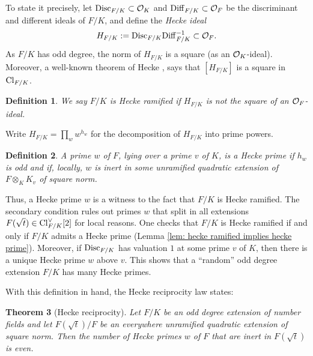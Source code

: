 \documentclass[11pt,a4paper]{amsart}
\def\O{{\rm \mathcal{O}}}
\def\Cl{{\rm Cl}}
\def\Diff{{\rm Diff}}
\def\Disc{{\rm Disc}}
\numberwithin{equation}{section}
\newtheorem{theorem}{Theorem}[section]
\newtheorem{definition}[theorem]{Definition}
\begin{document}
To state it precisely, let $\Disc_{F/K}\subset \O_K$ and $\Diff_{F/K} \subset \O_F$ be the discriminant and different ideals of $F/K$, and define the {\it Hecke ideal} 
 \[H_{F/K} := \Disc_{F/K} \mathrm{Diff}_{F/K}^{-1} \subset \O_F.\] As $F/K$ has odd degree, the norm of $H_{F/K}$ is a square (as an $\O_K$-ideal). Moreover,  
 a well-known theorem of Hecke \cite[pg. 291]{WeilBasicNumberTheory}, says that $[H_{F/K}]$ is a square in $\Cl_{F/K}$.  

 \begin{definition}
 {\em 
     We say $F/K$ is {\it Hecke ramified} if $H_{F/K}$ is {\it not} the square of an $\O_F$-ideal.
     }
 \end{definition}
 
 Write $H_{F/K} = \prod_w w^{h_w}$ for the decomposition of $H_{F/K}$ into prime powers.  
 \begin{definition}
  {\em   A prime $w$ of $F$, lying over a prime $v$ of $K$, is a {\it Hecke prime} if $h_w$ is odd and if, locally, $w$ is inert in some unramified quadratic extension of $F \otimes_K K_v$ of square norm.  
    }  
 \end{definition}

 Thus, a Hecke prime $w$ is a witness to the fact that $F/K$ is Hecke ramified.  The secondary condition rules out primes $w$ that split in all extensions $F(\sqrt{t}) \in \Cl_{F/K}^\vee[2]$ for local reasons. One checks that $F/K$ is Hecke ramified if and only if $F/K$ admits a Hecke prime (Lemma \ref{lem: hecke ramified implies hecke prime}).   
 Moreover, if $\Disc_{F/K}$ has valuation $1$ at some prime $v$ of $K$, then there is a unique Hecke prime $w$ above $v$. This shows that a ``random'' odd degree extension $F/K$ has many Hecke primes. 
 
With this definition in hand, the Hecke reciprocity law states:

\begin{theorem}[Hecke reciprocity]\label{thm: reciprocity law for odd degree intro}
    Let $F/K$ be an odd degree extension of number fields and let $F(\sqrt{t})/F$ be an everywhere unramified quadratic extension of square norm. Then the number of Hecke primes $w$ of $F$ that are inert in $F(\sqrt{t})$ is even.  
\end{theorem}
\end{document}
